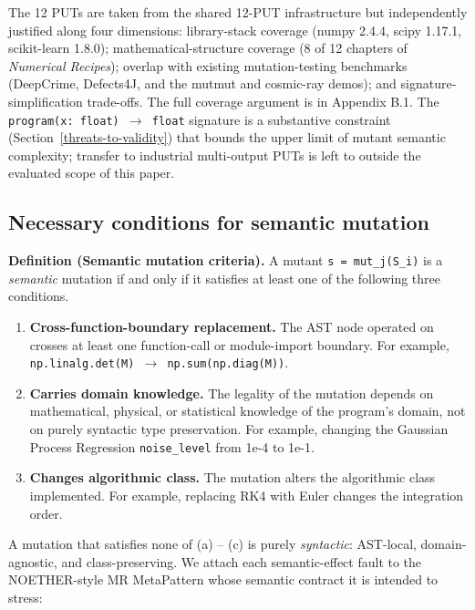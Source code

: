 \documentclass[manuscript,screen,review]{acmart}
\begin{document}
The 12 PUTs are taken from the shared 12-PUT infrastructure \citep{li2026minmrcomplete} but
independently justified along four dimensions: library-stack coverage
(numpy 2.4.4, scipy 1.17.1, scikit-learn 1.8.0); mathematical-structure
coverage (8 of 12 chapters of \emph{Numerical Recipes}); overlap with
existing mutation-testing benchmarks (DeepCrime, Defects4J, and the
mutmut and cosmic-ray demos); and signature-simplification trade-offs.
The full coverage argument is in Appendix B.1. The
\texttt{program(x:\ float)\ $\to$\ float} signature is a substantive
constraint (Section~\ref{threats-to-validity}) that bounds the upper limit of mutant semantic
complexity; transfer to industrial multi-output PUTs is left to
outside the evaluated scope of this paper.

\subsection{Necessary conditions for semantic mutation}\label{necessary-conditions-for-semantic-mutation-layer-1}

\textbf{Definition (Semantic mutation criteria).} A mutant
\texttt{s\textquotesingle{}\ =\ mut\_j(S\_i)} is a \emph{semantic}
mutation if and only if it satisfies at least one of the following three
conditions.

\begin{enumerate}
\item
  \textbf{Cross-function-boundary replacement.} The AST node operated on
  crosses at least one function-call or module-import boundary. For
  example, \texttt{np.linalg.det(M)\ $\to$\ np.sum(np.diag(M))}.
\item
  \textbf{Carries domain knowledge.} The legality of the mutation
  depends on mathematical, physical, or statistical knowledge of the
  program's domain, not on purely syntactic type preservation. For
  example, changing the Gaussian Process Regression
  \texttt{noise\_level} from 1e-4 to 1e-1.
\item
  \textbf{Changes algorithmic class.} The mutation alters the
  algorithmic class implemented. For example, replacing RK4 with Euler
  changes the integration order.
\end{enumerate}

A mutation that satisfies none of (a) -- (c) is purely \emph{syntactic}:
AST-local, domain-agnostic, and class-preserving. We attach each
semantic-effect fault to the NOETHER-style MR MetaPattern whose semantic
contract it is intended to stress:
\end{document}
